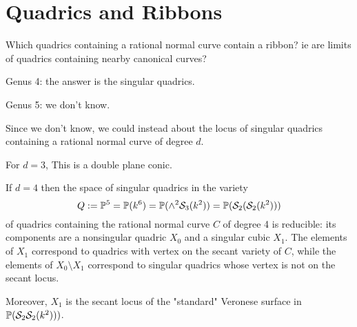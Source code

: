 

\chapter{Quadrics and Ribbons}
\label{Quadrics and Ribbons}

\begin{question}
 Which quadrics containing a rational normal curve contain a ribbon? ie are limits of quadrics containing nearby canonical curves?
\end{question}

Genus 4: the answer is the singular quadrics.


Genus 5: we don't know.

Since we don't know, we could instead about the locus of singular quadrics containing a rational normal curve of degree $d$.

For $d=3$, This is a double plane conic.

\def\cS{{\mathcal S}}
\begin{theorem}
 If $d=4$ then the space of singular quadrics in the variety
 $$
 Q :=\PP^5 = \PP(k^6) = \PP(\wedge^2 \cS_3(k^2)) = \PP(\cS_2(\cS_2(k^2)))
 $$
 of quadrics containing the rational normal curve $C$ of degree 4 is reducible: its components are a nonsingular quadric $X_0$ and a singular cubic $X_1$. The elements of $X_1$ correspond to quadrics with vertex on the secant variety of $C$, while the elements of $X_0\setminus X_1$ correspond to singular quadrics whose vertex is not on the secant locus.
 
 Moreover, $X_1$ is the secant locus of the "standard" Veronese surface in $\PP(\cS_2\cS_2(k^2)))$.
\end{theorem}

